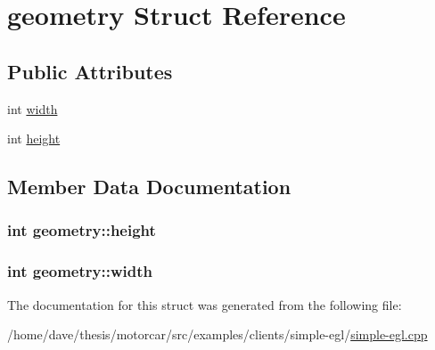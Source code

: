 \hypertarget{structgeometry}{\section{geometry Struct Reference}
\label{structgeometry}
}
\subsection*{Public Attributes}
\begin{DoxyCompactItemize}
\item 
int \hyperlink{structgeometry_a854a87ce277335591f06958a2363c3e1}{width}
\item 
int \hyperlink{structgeometry_a6968ae18c72699d1c164399bf0e5cf14}{height}
\end{DoxyCompactItemize}


\subsection{Member Data Documentation}
\hypertarget{structgeometry_a6968ae18c72699d1c164399bf0e5cf14}{
\subsubsection[{height}]{\setlength{\rightskip}{0pt plus 5cm}int geometry\-::height}}\label{structgeometry_a6968ae18c72699d1c164399bf0e5cf14}
\hypertarget{structgeometry_a854a87ce277335591f06958a2363c3e1}{
\subsubsection[{width}]{\setlength{\rightskip}{0pt plus 5cm}int geometry\-::width}}\label{structgeometry_a854a87ce277335591f06958a2363c3e1}


The documentation for this struct was generated from the following file\-:\begin{DoxyCompactItemize}
\item 
/home/dave/thesis/motorcar/src/examples/clients/simple-\/egl/\hyperlink{simple-egl_8cpp}{simple-\/egl.\-cpp}\end{DoxyCompactItemize}
